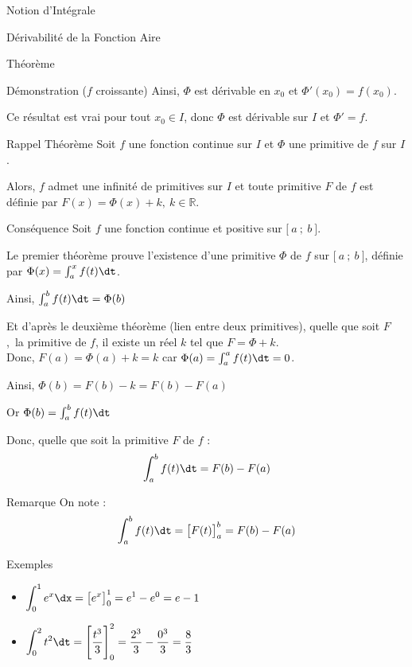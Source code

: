\documentclass{cours}
\begin{document}
\begin{Gpartie}{Notion d'Intégrale}
\begin{Spartie}{Dérivabilité de la Fonction Aire}
\begin{SSpartie}{Théorème}
\begin{SSSpartie}{Démonstration \big($f$ croissante\big)}
                    Ainsi, $\Phi$ est dérivable en $x_0$ et $\Phi'(x_0)=f(x_0)$.

                    Ce résultat est vrai pour tout $x_0\in I$, donc $\Phi$ est dérivable sur $I$ et $\Phi'=f$.
                \end{SSSpartie}
            \end{SSpartie}
            \begin{SSpartie}{Rappel Théorème} 
                Soit $f$ une fonction continue sur $I$ et $\Phi$ une primitive de $f$ sur $I$.

                Alors, $f$ admet une infinité de primitives sur $I$ et toute primitive $F$ de $f$ est définie par $F(x)=\Phi(x)+k,~k\in\mathbb{R}$.
            \end{SSpartie}
            \begin{SSpartie}{Conséquence} 
                Soit $f$ une fonction continue et positive sur $\big[~a~;~b~\big]$.

                Le premier théorème prouve l'existence d'une primitive $\Phi$ de $f$ sur $\big[~a~;~b~\big]$, définie par $\Phi(x)=\int_a^xf(t)\dt$.

                Ainsi, $\int_a^b f(t)\dt=\Phi(b)$

                Et d'après le deuxième théorème (lien entre deux primitives), quelle que soit $F$,~la primitive de $f$, il existe un réel $k$ tel que $F=\Phi+k$. \\ Donc, $F(a)=\Phi(a)+k=k$ car $\Phi(a)=\int_a^af(t)\dt=0$.

                Ainsi, $\Phi(b)=F(b)-k=F(b)-F(a)$

                Or $\Phi(b)=\int_a^b f(t)\dt$
                
                Donc, quelle que soit la primitive $F$ de $f$ : \[\int_a^b f(t)\dt=F(b)-F(a)\]
            \end{SSpartie}
            \begin{SSpartie}{Remarque} 
                On note : \[\int_a^b f(t)\dt=\big[F(t)\big]_a^b=F(b)-F(a)\]
            \end{SSpartie}
            \begin{SSpartie}{Exemples} 
                \begin{itemize}
                    \item $\displaystyle \int_0^1e^x\dx=\big[e^x\big]_0^1=e^1-e^0=e-1$
                    \item $\displaystyle \int_0^2t^2\dt=\Bigg[\frac{t^3}{3}\Bigg]_0^2=\frac{2^3}{3}-\frac{0^3}{3}=\frac{8}{3}$
                \end{itemize}
            \end{SSpartie}
        \end{Spartie}
    \end{Gpartie}
\end{document}
